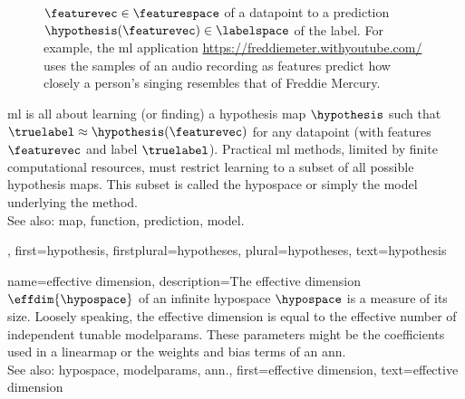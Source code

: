 {{\begin{figure}[htbp]
{				$\featurevec \in \featurespace$ of a \gls{datapoint} to a \gls{prediction} $\hypothesis(\featurevec) \in \labelspace$ of the \gls{label}. 
				For example, the \gls{ml} application \url{https://freddiemeter.withyoutube.com/} uses the samples of an audio 
				recording as \glspl{feature} predict how closely a person’s singing resembles that of Freddie Mercury.
				}
		\end{figure}
		\Gls{ml} is all about learning (or finding) a hypothesis \gls{map} $\hypothesis$ 
		such that $\truelabel \approx \hypothesis(\featurevec)$ for any \gls{datapoint} 
		(with \glspl{feature} $\featurevec$ and \gls{label} $\truelabel$). Practical \gls{ml} methods, 
		limited by finite computational resources, must restrict learning to a subset of all possible 
		hypothesis maps. This subset is called the \gls{hypospace} or simply the \gls{model} underlying 
		the method.
					\\ 
		See also: \gls{map}, \gls{function}, \gls{prediction}, \gls{model}.},
	first={hypothesis},
	firstplural={hypotheses},
	plural={hypotheses},
	text={hypothesis}  
}

{name={effective dimension},
	description={The effective dimension $\effdim{\hypospace}$ of 
		an infinite \gls{hypospace} $\hypospace$ is a measure of its size. Loosely speaking, the 
		effective dimension is equal to the effective number of independent tunable \glspl{modelparam}. 
		These \glspl{parameter} might be the coefficients used in a \gls{linearmap} or the 
		\gls{weights} and \gls{bias} terms of an \gls{ann}.
					\\ 
		See also: \gls{hypospace}, \glspl{modelparam}, \gls{ann}.},
	first={effective dimension},
	text={effective dimension}  
}

